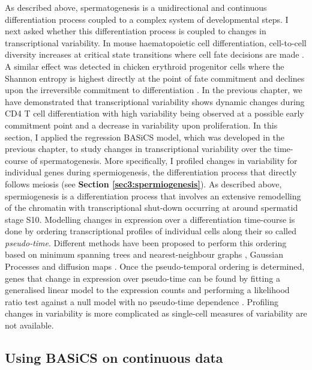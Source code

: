 As described above, spermatogenesis is a unidirectional and continuous differentiation process coupled to a complex system of developmental steps. I next asked whether this differentiation process is coupled to changes in transcriptional variability. In mouse haematopoietic cell differentiation, cell-to-cell diversity increases at critical state transitions where cell fate decisions are made \citep{Mojtahedi2016}. A similar effect was detected in chicken erythroid progenitor cells where the Shannon entropy is highest directly at the point of fate commitment and declines upon the irreversible commitment to differentiation \cite{Richard2016}. In the previous chapter, we have demonstrated that transcriptional variability shows dynamic changes during CD4\plus{} T cell differentiation with high variability being observed at a possible early commitment point and a decrease in variability upon proliferation. In this section, I applied the regression BASiCS model, which was developed in the previous chapter, to study changes in transcriptional variability over the time-course of spermatogenesis. More specifically, I profiled changes in variability for individual genes during spermiogenesis, the differentiation process that directly follows meiosis (see \textbf{Section \ref{sec3:spermiogenesis}}). As described above, spermiogenesis is a differentiation process that involves an extensive remodelling of the chromatin with transcriptional shut-down occurring at around spermatid stage S10. Modelling changes in expression over a differentiation time-course is done by ordering transcriptional profiles of individual cells along their so called \emph{pseudo-time}. Different methods have been proposed to perform this ordering based on minimum spanning trees \citep{Trapnell2014} and nearest-neighbour graphs \cite{Setty2016}, Gaussian Processes \citep{Reid2016a, Campbell2016b} and diffusion maps \citep{Haghverdi2016}. Once the pseudo-temporal ordering is determined, genes that change in expression over pseudo-time can be found by fitting a generalised linear model to the expression counts and performing a likelihood ratio test against a null model with no pseudo-time dependence \citep{Trapnell2014}. Profiling changes in variability is more complicated as single-cell measures of variability are not available. 

\subsection{Using BASiCS on continuous data}

